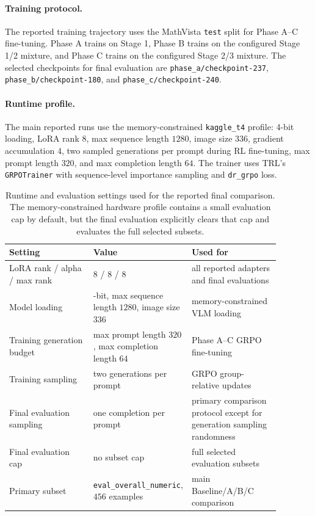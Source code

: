 \documentclass{article} %
\begin{document}
\paragraph{Training protocol.}
The reported training trajectory uses the MathVista \texttt{test} split for Phase A--C fine-tuning. Phase A trains on Stage 1, Phase B trains on the configured Stage 1/2 mixture, and Phase C trains on the configured Stage 2/3 mixture. The selected checkpoints for final evaluation are \texttt{phase\_a/checkpoint-237}, \texttt{phase\_b/checkpoint-180}, and \texttt{phase\_c/checkpoint-240}.

\paragraph{Runtime profile.}
The main reported runs use the memory-constrained \texttt{kaggle\_t4} profile: 4-bit loading, LoRA rank $8$, max sequence length $1280$, image size $336$, gradient accumulation $4$, two sampled generations per prompt during RL fine-tuning, max prompt length $320$, and max completion length $64$. The trainer uses TRL's \texttt{GRPOTrainer} with sequence-level importance sampling and \texttt{dr\_grpo} loss.

\begin{table}[t]
\centering
\setlength{\tabcolsep}{3pt}
\renewcommand{\arraystretch}{1.15}
\scriptsize
\begin{tabular}{>{\raggedright\arraybackslash}p{0.34\linewidth}>{\raggedright\arraybackslash}p{0.20\linewidth}>{\raggedright\arraybackslash}p{0.34\linewidth}}
\hline
\textbf{Setting} & \textbf{Value} & \textbf{Used for} \\
\hline
LoRA rank / alpha / max rank & $8$ / $8$ / $8$ & all reported adapters and final evaluations \\
\hline
Model loading & 4-bit, max sequence length $1280$, image size $336$ & memory-constrained VLM loading \\
\hline
Training generation budget & max prompt length $320$, max completion length $64$ & Phase A--C GRPO fine-tuning \\
\hline
Training sampling & two generations per prompt & GRPO group-relative updates \\
\hline
Final evaluation sampling & one completion per prompt & primary comparison protocol except for generation sampling randomness \\
\hline
Final evaluation cap & no subset cap & full selected evaluation subsets \\
\hline
Primary subset & \texttt{eval\_overall\_numeric}, $456$ examples & main Baseline/A/B/C comparison \\
\hline
\end{tabular}
\caption{Runtime and evaluation settings used for the reported final comparison. The memory-constrained hardware profile contains a small evaluation cap by default, but the final evaluation explicitly clears that cap and evaluates the full selected subsets.}
\label{tab:t4-profile}
\end{table}
\end{document}

